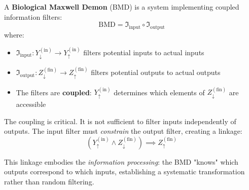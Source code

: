 \begin{definition}
\label{def:bmd_mizraji}
A \textbf{Biological Maxwell Demon} (BMD) is a system implementing coupled information filters:
\begin{equation}
\text{BMD} = \Im_{\text{input}} \circ \Im_{\text{output}}
\end{equation}
where:
\begin{itemize}
\item $\Im_{\text{input}}: Y_{\downarrow}^{(\text{in})} \to Y_{\uparrow}^{(\text{in})}$ filters potential inputs to actual inputs
\item $\Im_{\text{output}}: Z_{\downarrow}^{(\text{fin})} \to Z_{\uparrow}^{(\text{fin})}$ filters potential outputs to actual outputs
\item The filters are \textbf{coupled}: $Y_{\uparrow}^{(\text{in})}$ determines which elements of $Z_{\downarrow}^{(\text{fin})}$ are accessible
\end{itemize}
\end{definition}

The coupling is critical. It is not sufficient to filter inputs independently of outputs. The input filter must \textit{constrain} the output filter, creating a linkage:
\begin{equation}
(Y_{\uparrow}^{(\text{in})} \wedge Z_{\downarrow}^{(\text{fin})}) \implies Z_{\uparrow}^{(\text{fin})}
\end{equation}

This linkage embodies the \textit{information processing}: the BMD "knows" which outputs correspond to which inputs, establishing a systematic transformation rather than random filtering.


